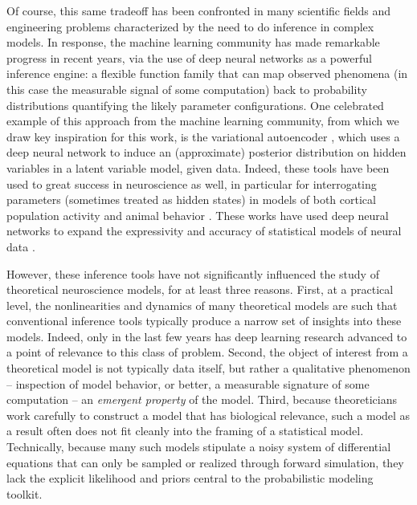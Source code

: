 \documentclass[11pt]{article}
\begin{document}
Of course, this same tradeoff has been confronted in many scientific fields and engineering problems characterized by the need to do inference in complex models.  
In response, the machine learning community has made remarkable progress in recent years, via the use of deep neural networks as a powerful inference engine: a flexible function family that can map observed phenomena (in this case the measurable signal of some computation) back to probability distributions quantifying the likely parameter configurations.  
One celebrated example of this approach from the machine learning community, from which we draw key inspiration for this work, is the variational autoencoder \cite{kingma2013auto, rezende2014stochastic}, which uses a deep neural network to induce an (approximate) posterior distribution on hidden variables in a latent variable model, given data. 
Indeed, these tools have been used to great success in neuroscience as well, in particular for interrogating parameters (sometimes treated as hidden states) in models of both cortical population activity \cite{gao2016linear, zhao2017recursive, barello2018sparse, pandarinath2018inferring} and animal behavior \cite{wiltschko2015mapping, johnson2016composing, batty2019behavenet}. 
These works have used deep neural networks to expand the expressivity and accuracy of statistical models of neural data \cite{paninski2018neural}. 

However, these inference tools have not significantly influenced the study of theoretical neuroscience models, for at least three reasons.  
First, at a practical level, the nonlinearities and dynamics of many theoretical models are such that conventional inference tools typically produce a narrow set of insights into these models.  
Indeed, only in the last few years has deep learning research advanced to a point of relevance to this class of problem.
Second, the object of interest from a theoretical model is not typically data itself, but rather a qualitative phenomenon -- inspection of model behavior, or better, a measurable signature of some computation -- an \emph{emergent property} of the model.  
Third, because theoreticians work carefully to construct a model that has biological relevance, such a model as a result often does not fit cleanly into the framing of a statistical model.  
Technically, because many such models stipulate a noisy system of differential equations that can only be sampled or realized through forward simulation, they lack the explicit likelihood and priors central to the probabilistic modeling toolkit.  
\end{document}
